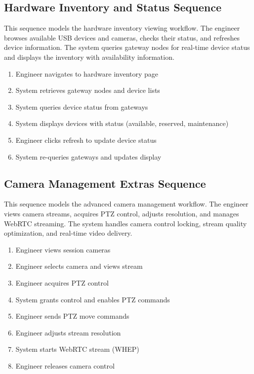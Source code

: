 
\subsection{Hardware Inventory and Status Sequence}
This sequence models the hardware inventory viewing workflow. The engineer
browses available USB devices and cameras, checks their status, and refreshes
device information. The system queries gateway nodes for real-time device
status and displays the inventory with availability information.

\begin{enumerate}[topsep=0pt,itemsep=1pt,parsep=0pt,partopsep=0pt]
    \item Engineer navigates to hardware inventory page
    \item System retrieves gateway nodes and device lists
    \item System queries device status from gateways
    \item System displays devices with status (available, reserved, maintenance)
    \item Engineer clicks refresh to update device status
    \item System re-queries gateways and updates display
\end{enumerate}


\subsection{Camera Management Extras Sequence}
This sequence models the advanced camera management workflow. The engineer
views camera streams, acquires PTZ control, adjusts resolution, and manages
WebRTC streaming. The system handles camera control locking, stream quality
optimization, and real-time video delivery.

\begin{enumerate}[topsep=0pt,itemsep=1pt,parsep=0pt,partopsep=0pt]
    \item Engineer views session cameras
    \item Engineer selects camera and views stream
    \item Engineer acquires PTZ control
    \item System grants control and enables PTZ commands
    \item Engineer sends PTZ move commands
    \item Engineer adjusts stream resolution
    \item System starts WebRTC stream (WHEP)
    \item Engineer releases camera control
\end{enumerate}

